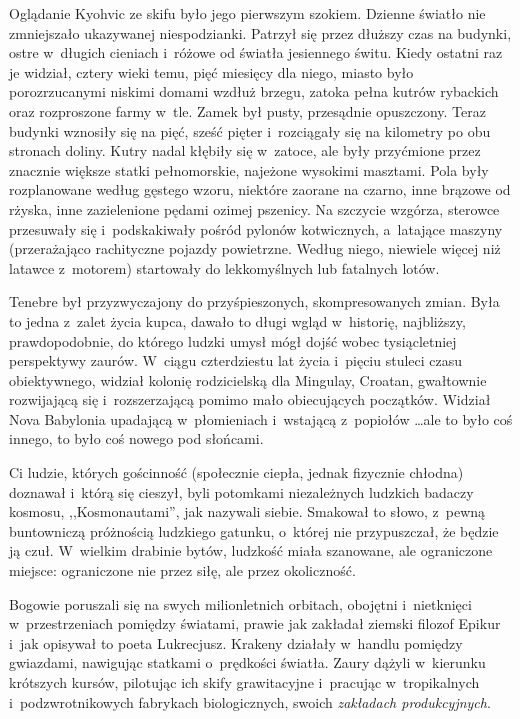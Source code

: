 \documentclass[oneside,polish,12pt,sfheadings]{mwbk}
\begin{document}
Oglądanie Kyohvic ze skifu było jego pierwszym szokiem. Dzienne światło
nie zmniejszało ukazywanej niespodzianki. Patrzył się przez dłuższy czas
na budynki, ostre w~długich cieniach i~różowe od światła jesiennego
świtu. Kiedy ostatni raz je widział, cztery wieki temu, pięć miesięcy
dla niego, miasto było porozrzucanymi niskimi domami wzdłuż brzegu,
zatoka pełna kutrów rybackich oraz rozproszone farmy w~tle. Zamek był
pusty, przesądnie opuszczony. Teraz budynki wznosiły się na pięć, sześć
pięter i~rozciągały się na kilometry po obu stronach doliny. Kutry nadal
kłębiły się w~zatoce, ale były przyćmione przez znacznie większe statki
pełnomorskie, najeżone wysokimi masztami. Pola były rozplanowane według
gęstego wzoru, niektóre zaorane na czarno, inne brązowe od rżyska, inne
zazielenione pędami ozimej pszenicy. Na szczycie wzgórza, sterowce
przesuwały się i~podskakiwały pośród pylonów kotwicznych, a~latające
maszyny (przerażająco rachityczne pojazdy powietrzne. Według niego,
niewiele więcej niż latawce z~motorem) startowały do lekkomyślnych lub
fatalnych lotów.

Tenebre był przyzwyczajony do przyśpieszonych, skompresowanych zmian.
Była to jedna z~zalet życia kupca, dawało to długi wgląd w~historię,
najbliższy, prawdopodobnie, do którego ludzki umysł mógł dojść wobec
tysiącletniej perspektywy zaurów. W~ciągu czterdziestu lat życia i~pięciu stuleci czasu obiektywnego, widział kolonię rodzicielską dla
Mingulay, Croatan, gwałtownie rozwijającą się i~rozszerzającą pomimo
mało obiecujących początków. Widział Nova Babylonia upadającą w~płomieniach i~wstającą z~popiołów \ldots ale to było coś innego, to było
coś nowego pod słońcami.

Ci ludzie, których gościnność (społecznie ciepła, jednak fizycznie
chłodna) doznawał i~którą się cieszył, byli potomkami niezależnych
ludzkich badaczy kosmosu, ,,Kosmonautami'', jak nazywali siebie. Smakował
to słowo, z~pewną buntowniczą próżnością ludzkiego gatunku, o~której nie
przypuszczał, że będzie ją czuł. W~wielkim drabinie bytów, ludzkość
miała szanowane, ale ograniczone miejsce: ograniczone nie przez siłę,
ale przez okoliczność.

Bogowie poruszali się na swych milionletnich orbitach, obojętni i~nietknięci w~przestrzeniach pomiędzy światami, prawie jak zakładał
ziemski filozof Epikur i~jak opisywał to poeta Lukrecjusz. Krakeny
działały w~handlu pomiędzy gwiazdami, nawigując statkami o~prędkości
światła. Zaury dążyli w~kierunku krótszych kursów, pilotując ich skify
grawitacyjne i~pracując w~tropikalnych i~podzwrotnikowych fabrykach
biologicznych, swoich \emph{zakładach produkcyjnych}.
\end{document}
